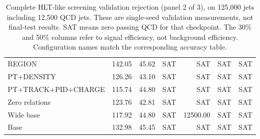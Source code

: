 \begin{table}[htbp]
\begin{tabularx}{\linewidth}{@{}Xrrrrrr@{}}
REGION & 142.05 & 45.62 & SAT & SAT & SAT & SAT \\ %
PT+DENSITY & 126.26 & 43.10 & SAT & SAT & SAT & SAT \\ %
PT+TRACK+PID+CHARGE & 115.74 & 44.80 & SAT & SAT & SAT & SAT \\ %
Zero relations & 123.76 & 42.81 & SAT & SAT & SAT & SAT \\ %
Wide base & 117.92 & 44.80 & SAT & 12500.00 & SAT & SAT \\ %
Base & 132.98 & 45.45 & SAT & SAT & SAT & SAT \\ %
\bottomrule
\end{tabularx}
\caption{Complete HLT-like screening validation rejection (panel 2 of 3),
on 125,000 jets including 12,500 QCD jets. These are single-seed validation measurements, not final-test results.
SAT means zero passing QCD for that checkpoint.
The 30\% and 50\% columns refer to signal efficiency, not background
efficiency. Configuration names match the corresponding accuracy table.}
\label{tab:hlt-screen-rejection-2}
\end{table}
